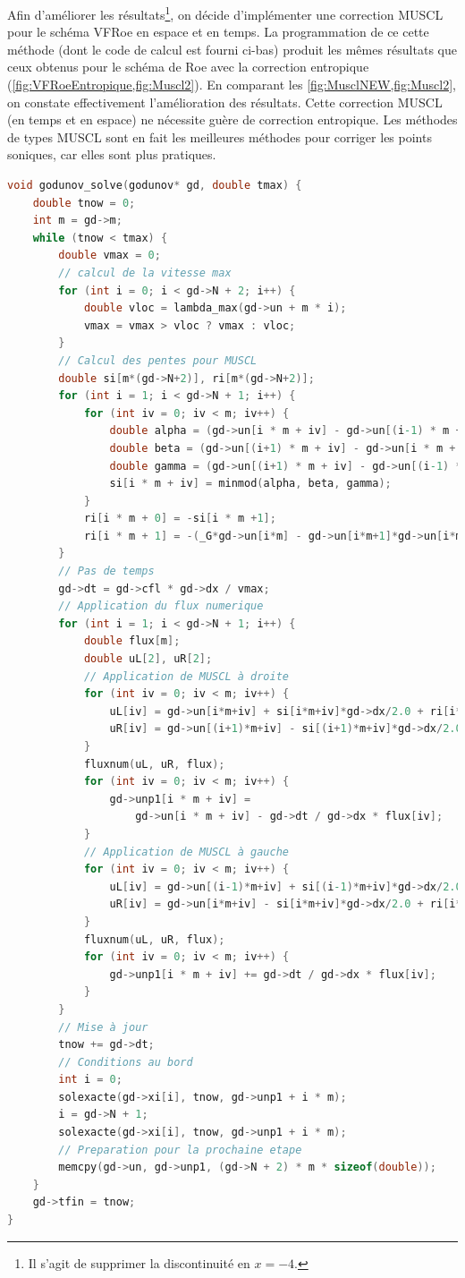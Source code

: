 \documentclass[
	french,
	11pt, %
]{fphw}
\begin{document}
\noindent Afin d'améliorer les résultats\footnote{Il s'agit de supprimer la discontinuité en $x=-4$.}, on décide d'implémenter une correction MUSCL pour le schéma VFRoe en espace et en temps. La programmation de ce cette méthode (dont le code de calcul est fourni ci-bas) produit les mêmes résultats que ceux obtenus pour le schéma de Roe avec la correction entropique (\cref{fig:VFRoeEntropique,fig:Muscl2}). En comparant les \cref{fig:MusclNEW,fig:Muscl2}, on constate effectivement l'amélioration des résultats. Cette correction MUSCL (en temps et en espace) ne nécessite guère de correction entropique. Les méthodes de types MUSCL sont en fait les meilleures méthodes pour corriger les points soniques, car elles sont plus pratiques.


\begin{lstlisting}[language=C, caption={Application de la correction MUSCL. La fonction "fluxnum" observée correspond au flux VFRoe sans correction entropique.},breaklines]
void godunov_solve(godunov* gd, double tmax) {
	double tnow = 0;
	int m = gd->m;
	while (tnow < tmax) {
		double vmax = 0;
		// calcul de la vitesse max
		for (int i = 0; i < gd->N + 2; i++) {
			double vloc = lambda_max(gd->un + m * i);
			vmax = vmax > vloc ? vmax : vloc;
		}
		// Calcul des pentes pour MUSCL
		double si[m*(gd->N+2)], ri[m*(gd->N+2)];
		for (int i = 1; i < gd->N + 1; i++) {
			for (int iv = 0; iv < m; iv++) {
				double alpha = (gd->un[i * m + iv] - gd->un[(i-1) * m + iv])/gd->dx;
				double beta = (gd->un[(i+1) * m + iv] - gd->un[i * m + iv])/gd->dx;
				double gamma = (gd->un[(i+1) * m + iv] - gd->un[(i-1) * m + iv])/(2.0*gd->dx);
				si[i * m + iv] = minmod(alpha, beta, gamma);
			}   
			ri[i * m + 0] = -si[i * m +1];
			ri[i * m + 1] = -(_G*gd->un[i*m] - gd->un[i*m+1]*gd->un[i*m+1]/(gd->un[i*m]*gd->un[i*m]))*si[i*m+0] - 2*si[i*m+1]*gd->un[i*m+1]/gd->un[i*m];
		}
		// Pas de temps
		gd->dt = gd->cfl * gd->dx / vmax;
		// Application du flux numerique
		for (int i = 1; i < gd->N + 1; i++) {
			double flux[m];
			double uL[2], uR[2];
			// Application de MUSCL à droite
			for (int iv = 0; iv < m; iv++) {
				uL[iv] = gd->un[i*m+iv] + si[i*m+iv]*gd->dx/2.0 + ri[i*m+iv]*gd->dt/2.0;
				uR[iv] = gd->un[(i+1)*m+iv] - si[(i+1)*m+iv]*gd->dx/2.0 + ri[(i+1)*m+iv]*gd->dt/2.0;
			}
			fluxnum(uL, uR, flux);
			for (int iv = 0; iv < m; iv++) {
				gd->unp1[i * m + iv] =
					gd->un[i * m + iv] - gd->dt / gd->dx * flux[iv];
			}
			// Application de MUSCL à gauche
			for (int iv = 0; iv < m; iv++) {
				uL[iv] = gd->un[(i-1)*m+iv] + si[(i-1)*m+iv]*gd->dx/2.0 + ri[(i-1)*m+iv]*gd->dt/2.0;
				uR[iv] = gd->un[i*m+iv] - si[i*m+iv]*gd->dx/2.0 + ri[i*m+iv]*gd->dt/2.0;
			}
			fluxnum(uL, uR, flux);
			for (int iv = 0; iv < m; iv++) {
				gd->unp1[i * m + iv] += gd->dt / gd->dx * flux[iv];
			}
		}
		// Mise à jour
		tnow += gd->dt;
		// Conditions au bord
		int i = 0;
		solexacte(gd->xi[i], tnow, gd->unp1 + i * m);
		i = gd->N + 1;
		solexacte(gd->xi[i], tnow, gd->unp1 + i * m);
		// Preparation pour la prochaine etape
		memcpy(gd->un, gd->unp1, (gd->N + 2) * m * sizeof(double));
	}
	gd->tfin = tnow;
}	
\end{lstlisting}
\end{document}
